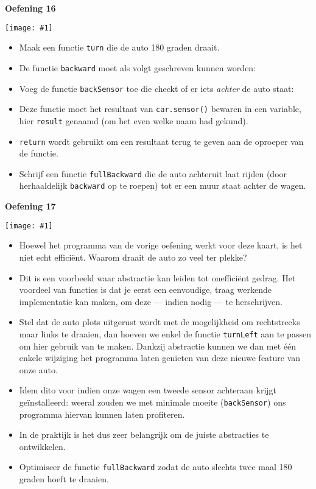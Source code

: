 \documentclass[a4paper]{article}
\newcommand{\newexercise}[1]{\clearpage\begin{center}\Huge\bf #1\end{center}}
\newcommand{\exercisemap}[1]{\begin{center}\texttt{[image: \#1]}\end{center}}
\newcommand{\code}[1]{
  \begin{center}
    \begin{minipage}{.8\linewidth}
      
    \end{minipage}
  \end{center}
}
\begin{document}
\newexercise{Oefening 16}
\exercisemap{ex16}
\begin{itemize}
  \item Maak een functie \verb'turn' die de auto 180 graden draait.
  \item De functie \verb'backward' moet als volgt geschreven kunnen worden:
        \code{backward.js}
  \item Voeg de functie \verb'backSensor' toe die checkt of er iets \emph{achter} de auto staat:
        \code{backsensor.js}
  \item Deze functie moet het resultaat van \verb'car.sensor()' bewaren in een variable,
        hier \verb'result' genaamd (om het even welke naam had gekund).
  \item \verb'return' wordt gebruikt om een resultaat terug te geven aan de oproeper van de functie.
  \item Schrijf een functie \verb'fullBackward' die de auto achteruit laat rijden
        (door herhaaldelijk \verb'backward' op te roepen) tot er een muur staat achter de wagen.
\end{itemize}


\newexercise{Oefening 17}
\exercisemap{ex17}
\begin{itemize}
  \item Hoewel het programma van de vorige oefening werkt voor deze kaart,
        is het niet echt effici\"ent. Waarom draait de auto zo veel ter plekke?
  \item Dit is een voorbeeld waar abstractie kan leiden tot oneffici\"ent gedrag.
        Het voordeel van functies is dat je eerst een eenvoudige, traag werkende implementatie kan
        maken, om deze --- indien nodig --- te herschrijven.
  \item Stel dat de auto plots uitgerust wordt met de mogelijkheid om rechtstreeks
        maar links te draaien, dan hoeven we enkel de functie \verb'turnLeft' aan te passen
        om hier gebruik van te maken. Dankzij abstractie kunnen we dan
        met \'e\'en enkele wijziging het programma laten genieten van deze nieuwe feature van onze auto.
  \item Idem dito voor indien onze wagen een tweede sensor achteraan krijgt ge\"installeerd:
        weeral zouden we met minimale moeite (\verb'backSensor') ons programma hiervan kunnen laten profiteren.
  \item In de praktijk is het dus zeer belangrijk om de juiste abstracties te ontwikkelen.
  \item Optimiseer de functie \verb'fullBackward' zodat de auto
        slechts twee maal 180 graden hoeft te draaien.
\end{itemize}
\end{document}
